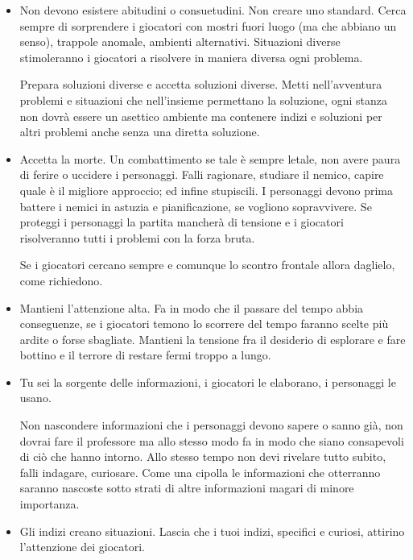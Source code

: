 \begin{multicols}{2}
\begin{itemize}[leftmargin=*]
\item
Non devono esistere abitudini o consuetudini. Non creare uno standard.
Cerca sempre di sorprendere i giocatori con mostri fuori luogo (ma che abbiano un senso), trappole anomale, ambienti alternativi. Situazioni diverse stimoleranno i giocatori a risolvere in maniera diversa ogni problema.

Prepara soluzioni diverse e accetta soluzioni diverse. Metti nell'avventura problemi e situazioni che nell'insieme permettano la soluzione, ogni stanza non dovrà essere un asettico ambiente ma contenere indizi e soluzioni per altri problemi anche senza una diretta soluzione.

\item
Accetta la morte. Un combattimento se tale è sempre letale, non avere paura di ferire o uccidere i personaggi. Falli ragionare, studiare il nemico, capire quale è il migliore approccio; ed infine stupiscili. I personaggi devono prima battere i nemici in astuzia e pianificazione, se vogliono sopravvivere.
Se proteggi i personaggi la partita mancherà di tensione e i giocatori risolveranno tutti i problemi con la forza bruta.

Se i giocatori cercano sempre e comunque lo scontro frontale allora daglielo, come richiedono.

\item
Mantieni l'attenzione alta. Fa in modo che il passare del tempo abbia conseguenze, se i giocatori temono lo scorrere del tempo faranno scelte più ardite o forse sbagliate. Mantieni la tensione fra il desiderio di esplorare e fare bottino e il terrore di restare fermi troppo a lungo.

\item
Tu sei la sorgente delle informazioni, i giocatori le elaborano, i personaggi le usano.

Non nascondere informazioni che i personaggi devono sapere o sanno già, non dovrai fare il professore ma allo stesso modo fa in modo che siano consapevoli di ciò che hanno intorno.
Allo stesso tempo non devi rivelare tutto subito, falli indagare, curiosare. Come una cipolla le informazioni che otterranno saranno nascoste sotto strati di altre informazioni magari di minore importanza.

\item
Gli indizi creano situazioni. Lascia che i tuoi indizi, specifici e curiosi, attirino l'attenzione dei giocatori.%


\end{itemize}
\end{multicols}
